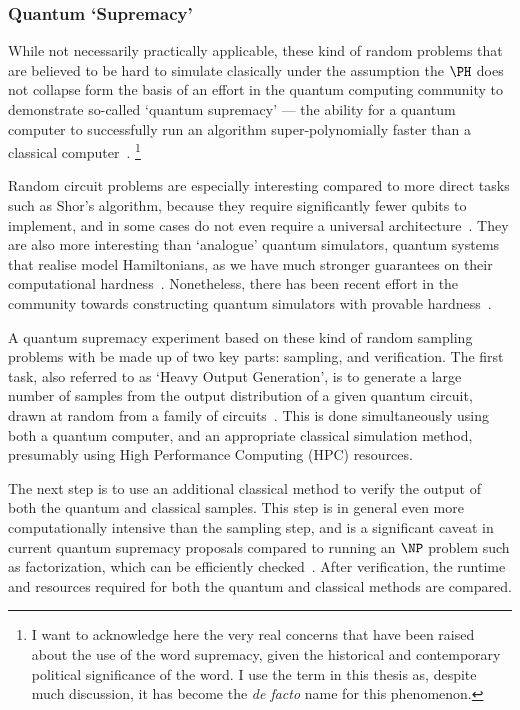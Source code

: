 \subsubsection*{Quantum `Supremacy'}
While not necessarily practically applicable, these kind of random problems that are believed to be hard to simulate clasically under the assumption the $\PH$ does not collapse form the basis of an effort in the quantum computing community to demonstrate so-called `quantum supremacy' --- the ability for a quantum computer to successfully run an algorithm super-polynomially faster than a classical computer~\cite{Preskill2012}.
\footnote{I want to acknowledge here the very real concerns that have been raised about the use of the word supremacy, given the historical and contemporary political significance of the word. I use the term in this thesis as, despite much discussion, it has become the \emph{de facto} name for this phenomenon.}
\par
Random circuit problems are especially interesting compared to more direct tasks such as Shor's algorithm, because they require significantly fewer qubits to implement, and in some cases do not even require a universal architecture~\cite{Montanaro2017}. They are also more interesting than `analogue' quantum simulators, quantum systems that realise model Hamiltonians, as we have much stronger guarantees on their computational hardness~\cite{Montanaro2017}. Nonetheless, there has been recent effort in the community towards constructing quantum simulators with provable hardness~\cite{Hangleiter2017,Gao2017,BermejoVega2018,Haferkamp2019}.\par
A quantum supremacy experiment based on these kind of random sampling problems with be made up of two key parts: sampling, and verification. The first task, also referred to as `Heavy Output Generation', is to generate a large number of samples from the output distribution of a given quantum circuit, drawn at random from a family of circuits~\cite{Aaronson2016}. This is done simultaneously using both a quantum computer, and an appropriate classical simulation method, presumably using High Performance Computing (HPC) resources.\par
The next step is to use an additional classical method to verify the output of both the quantum and classical samples. This step is in general even more computationally intensive than the sampling step, and is a significant caveat in current quantum supremacy proposals compared to running an $\NP$ problem such as factorization, which can be efficiently checked~\cite{Harrow2017}. After verification, the runtime and resources required for both the quantum and classical methods are compared.\par

